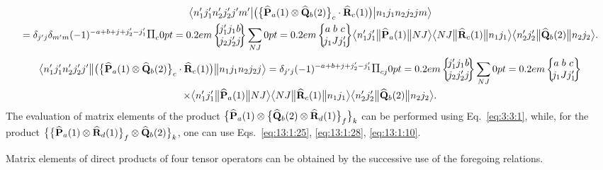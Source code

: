 \begin{multline}
\braOket{ n_{1}^{\prime} j_{1}^{\prime} n_{2}^{\prime} j_{2}^{\prime} j^{\prime} m^{\prime}}{\bigl(\bigl\{\widehat{\vect{P}}_{a}(1) \otimes \widehat{\vect{Q}}_{b}(2)\bigr\}_{c} \cdot \widehat{\vect{R}}_{c}(1)\bigr)}{n_{1} j_{1} n_{2} j_{2} j m}
\\=\delta_{j^{\prime} j} \delta_{m^{\prime} m}(-1)^{-a+b+j+j_{2}^{\prime}-j_{1}^{\prime}} \Fact{c} \sixj{j_{1}^{\prime}}{j_{1}}{b}{j_{2}}{j_{2}^{\prime}}{j} \sum_{N J}
\sixj{a}{b}{c}{j_{1}}{J}{j_{1}^{\prime}}
\braOketred{ n_{1}^{\prime} j_{1}^{\prime}}{\widehat{\vect{P}}_{a}(1)}{ N J}
\braOketred{ N J}{\widehat{\vect{R}}_{c}(1)}{ n_{1} j_{1}}
\braOketred{ n_{2}^{\prime} j_{2}^{\prime}}{\widehat{\vect{Q}}_{b}(2)}{ n_{2} j_{2}} . \label{eq:13:1:32}
\end{multline}
\begin{multline*}
\braOketred{ n_{1}^{\prime} j_{1}^{\prime} n_{2}^{\prime} j_{2}^{\prime} j^{\prime}}{\bigl(\bigl\{\widehat{\vect{P}}_{a}(1) \otimes \widehat{\vect{Q}}_{b}(2)\bigr\}_{c} \cdot \widehat{\vect{R}}_{c}(1)\bigr)}{n_{1} j_{1} n_{2} j_{2} j}
=\delta_{j^{\prime} j}(-1)^{-a+b+j+j_{2}^{\prime}-j_{1}^{\prime}} \Fact{c j} \sixj{j_{1}^{\prime}}{j_{1}}{b}{j_{2}}{j_{2}^{\prime}}{j} \sum_{N J}
\sixj{a}{b}{c}{j_{1}}{J}{j_{1}^{\prime}} \\
\times
\braOketred{ n_{1}^{\prime} j_{1}^{\prime}}{\widehat{\vect{P}}_{a}(1)}{ N J}
\braOketred{ N J}{\widehat{\vect{R}}_{c}(1)}{ n_{1} j_{1}}
\braOketred{ n_{2}^{\prime} j_{2}^{\prime}}{\widehat{\vect{Q}}_{b}(2)}{ n_{2} j_{2}} .
\end{multline*}
The evaluation of matrix elements of the product \(\bigl\{\widehat{\mathbf{P}}_{a}(1) \otimes\bigl\{\widehat{\mathbf{Q}}_{b}(2) \otimes \widehat{\mathbf{R}}_{d}(1)\bigr\}_{f}\bigr\}_{k}\) can be performed using Eq.~\eqref{eq:3:3:1}, while, for the product \(\bigl\{\bigl\{\widehat{\mathbf{P}}_{a}(1) \otimes \widehat{\mathbf{R}}_{d}(1)\bigr\}_{f} \otimes \widehat{\mathbf{Q}}_{b}(2)\bigr\}_{k}\), one can use Eqs.~\eqref{eq:13:1:25}, \eqref{eq:13:1:28}, \eqref{eq:13:1:10}.

Matrix elements of direct products of four tensor operators can be obtained by the successive use of the foregoing relations.

